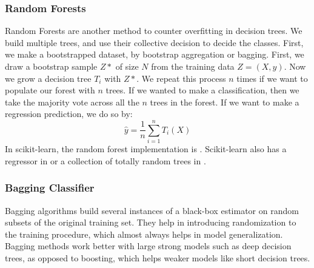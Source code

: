 \documentclass{article}
\newcommand{\code}[1]{{\fontfamily{zi4} \selectfont{#1}}}
\begin{document}
\subsubsection{Random Forests}
Random Forests are another method to counter overfitting in decision trees. We build multiple trees, and use their collective decision to decide the classes. First, we make a bootstrapped dataset, by bootstrap aggregation or bagging. First, we draw a bootstrap sample $Z*$ of size $N$ from the training data $Z=(X, y)$. Now we grow a decision tree $T_i$ with $Z*$. We repeat this process $n$ times if we want to populate our forest with $n$ trees. If we wanted to make a classification, then we take the majority vote across all the $n$ trees in the forest. If we want to make a regression prediction, we do so by:
$$\hat{y} = \frac{1}{n} \sum_{i=1}^n T_i(X)$$
In scikit-learn, the random forest implementation is \code{sklearn.ensemble.RandomForestClassifier()}. Scikit-learn also has a regressor in \code{sklearn.ensemble.RandomForestRegressor()} or a collection of totally random trees in \code{sklearn.ensemble.RandomTreesEmbedding()}.

\subsubsection{Bagging Classifier}
Bagging algorithms build several instances of a black-box estimator on random subsets of the original training set. They help in introducing randomization to the training procedure, which almost always helps in model generalization. Bagging methods work better with large strong models such as deep decision trees, as opposed to boosting, which helps weaker models like short decision trees.
\end{document}
